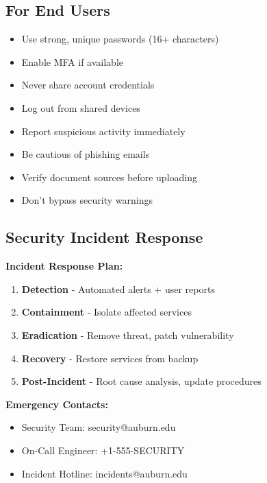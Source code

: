 \subsection{For End Users}

\begin{itemize}
    \item Use strong, unique passwords (16+ characters)
    \item Enable MFA if available
    \item Never share account credentials
    \item Log out from shared devices
    \item Report suspicious activity immediately
    \item Be cautious of phishing emails
    \item Verify document sources before uploading
    \item Don't bypass security warnings
\end{itemize}

\subsection{Security Incident Response}

\textbf{Incident Response Plan:}
\begin{enumerate}
    \item \textbf{Detection} - Automated alerts + user reports
    \item \textbf{Containment} - Isolate affected services
    \item \textbf{Eradication} - Remove threat, patch vulnerability
    \item \textbf{Recovery} - Restore services from backup
    \item \textbf{Post-Incident} - Root cause analysis, update procedures
\end{enumerate}

\textbf{Emergency Contacts:}
\begin{itemize}
    \item Security Team: security@auburn.edu
    \item On-Call Engineer: +1-555-SECURITY
    \item Incident Hotline: incidents@auburn.edu
\end{itemize}



